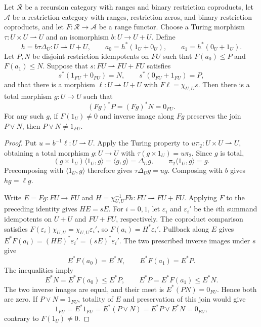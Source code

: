 \begin{theorem}\label{thm:comparison}
Let $\mathscr R$ be a recursion category with ranges and binary
restriction coproducts, let $\mathcal A$ be a restriction category with
ranges, restriction zeros, and binary restriction coproducts, and let
$F:\mathscr R\to\mathcal A$ be a range functor.
Choose a Turing morphism $\tau:U\times U\rightharpoonup U$ and an
isomorphism $b:U\to U+U$. Define
\[
 h=b\tau\Delta_U:U\rightharpoonup U+U,\qquad
 a_0=h^*(1_U+0_U),\qquad a_1=h^*(0_U+1_U).
\]
Let $P,N$ be disjoint restriction idempotents on $FU$ such that
$F(a_0)\le P$ and $F(a_1)\le N$. Suppose that
$s:FU\rightharpoonup FU+FU$ satisfies
\[
 s^*(1_{FU}+0_{FU})=N,\qquad
 s^*(0_{FU}+1_{FU})=P,
\]
and that there is a morphism $\ell:U\rightharpoonup U+U$ with
$F\ell=\chi_{U,U}s$.
Then there is a total morphism $g:U\to U$ such that
\[
 (Fg)^*P=(Fg)^*N=0_{FU}.
\]
For any such $g$, if $F(1_U)\ne0$ and inverse image along $Fg$ preserves the join
$P\vee N$, then $P\vee N\ne1_{FU}$.
\end{theorem}
\begin{proof}
Put $u=b^{-1}\ell:U\rightharpoonup U$. Apply the Turing property
to $u\pi_2:U\times U\rightharpoonup U$, obtaining a total morphism
$g:U\to U$ with $\tau(g\times1_U)=u\pi_2$.
Since $g$ is total,
\[
 (g\times1_U)\langle1_U,g\rangle=\langle g,g\rangle=\Delta_Ug,
 \qquad \pi_2\langle1_U,g\rangle=g.
\]
Precomposing with $\langle1_U,g\rangle$ therefore gives
$\tau\Delta_Ug=ug$. Composing with $b$ gives $hg=\ell g$.

Write
$E=Fg:FU\to FU$ and
$H=\chi_{U,U}^{-1}Fh:FU\rightharpoonup FU+FU$.
Applying $F$ to the preceding identity gives $HE=sE$.
For $i=0,1$, let $\varepsilon_i$ and $\varepsilon_i'$ be the $i$th summand
idempotents on $U+U$ and $FU+FU$, respectively. The coproduct comparison
satisfies $F(\varepsilon_i)\chi_{U,U}=\chi_{U,U}\varepsilon_i'$, so
$F(a_i)=H^*\varepsilon_i'$. Pullback along $E$ gives
$E^*F(a_i)=(HE)^*\varepsilon_i'=(sE)^*\varepsilon_i'$.
The two prescribed inverse images under $s$ give
\[
 E^*F(a_0)=E^*N,\qquad E^*F(a_1)=E^*P.
\]
The inequalities imply
\[
 E^*N=E^*F(a_0)\le E^*P,\qquad
 E^*P=E^*F(a_1)\le E^*N.
\]
The two inverse images are equal, and their meet is
$E^*(PN)=0_{FU}$. Hence both are zero.
If $P\vee N=1_{FU}$, totality of $E$ and preservation of this join
would give
\[
 1_{FU}=E^*1_{FU}=E^*(P\vee N)
       =E^*P\vee E^*N=0_{FU},
\]
contrary to $F(1_U)\ne0$.
\end{proof}

